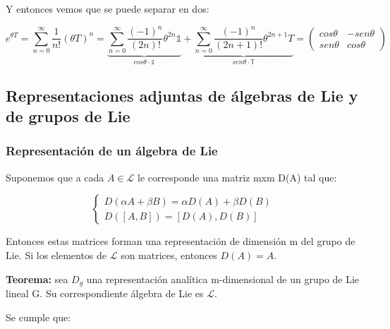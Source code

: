 \documentclass{article}
\begin{document}
         Y entonces vemos que se puede separar en dos:

         $$e^{\theta T}=\sum _{n=0}^\infty \frac{1}{n!} (\theta T)^n = \underbrace{\sum _{n=0}^\infty \frac{(-1)^{n}}{(2n)!}\theta ^{2n} \mathds{1}}_{cos \theta \cdot \mathds{1}} + \underbrace{ \sum _{n=0}^\infty \frac{(-1)^{n}}{(2n+1)!}\theta ^{2n+1} T}_{sen \theta \cdot \mathds{T}}= \left ( \begin{array}{cc}
             cos \theta & -sen \theta \\
            sen \theta  & cos \theta
         \end{array}\right) $$


         \subsection{Representaciones adjuntas de álgebras de Lie y de grupos de Lie}

         \subsubsection{Representación de un álgebra de Lie}

         Suponemos que a cada $A \in \mathcal{L}$ le corresponde una matriz mxm D(A) tal que:

         $$\left \lbrace \begin{array}{c}
              D(\alpha A+\beta B)=\alpha D(A) + \beta D(B)  \\
              D([A,B])=[D(A),D(B)]
         \end{array} \right .$$

         Entonces estas matrices forman una representación de dimensión m del grupo de Lie. Si los elementos de $\mathcal{L}$ son matrices, entonces $D(A)=A$.

         \smallskip
         \textbf{Teorema:} sea $D_g$ una representación analítica m-dimensional de un grupo de Lie lineal G. Su correspondiente álgebra de Lie es $\mathcal{L}$.

         Se cumple que:
\end{document}
